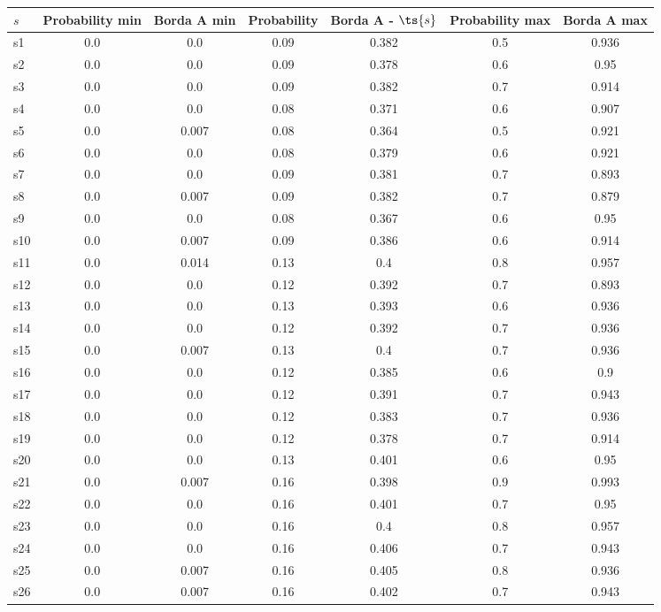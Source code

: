 \documentclass{article}
\begin{document}
\noindent\begin{tabular}{|l|c|c|c|c|c|c|}
\hline
$s$& Probability min & Borda A min & Probability & Borda A - $\ts{s}$ & Probability max & Borda A max\\
\hline
s1 &0.0 & 0.0 & 0.09 & 0.382 & 0.5 & 0.936\\
\hline
s2 &0.0 & 0.0 & 0.09 & 0.378 & 0.6 & 0.95\\
\hline
s3 &0.0 & 0.0 & 0.09 & 0.382 & 0.7 & 0.914\\
\hline
s4 &0.0 & 0.0 & 0.08 & 0.371 & 0.6 & 0.907\\
\hline
s5 &0.0 & 0.007 & 0.08 & 0.364 & 0.5 & 0.921\\
\hline
s6 &0.0 & 0.0 & 0.08 & 0.379 & 0.6 & 0.921\\
\hline
s7 &0.0 & 0.0 & 0.09 & 0.381 & 0.7 & 0.893\\
\hline
s8 &0.0 & 0.007 & 0.09 & 0.382 & 0.7 & 0.879\\
\hline
s9 &0.0 & 0.0 & 0.08 & 0.367 & 0.6 & 0.95\\
\hline
s10 &0.0 & 0.007 & 0.09 & 0.386 & 0.6 & 0.914\\
\hline
s11 &0.0 & 0.014 & 0.13 & 0.4 & 0.8 & 0.957\\
\hline
s12 &0.0 & 0.0 & 0.12 & 0.392 & 0.7 & 0.893\\
\hline
s13 &0.0 & 0.0 & 0.13 & 0.393 & 0.6 & 0.936\\
\hline
s14 &0.0 & 0.0 & 0.12 & 0.392 & 0.7 & 0.936\\
\hline
s15 &0.0 & 0.007 & 0.13 & 0.4 & 0.7 & 0.936\\
\hline
s16 &0.0 & 0.0 & 0.12 & 0.385 & 0.6 & 0.9\\
\hline
s17 &0.0 & 0.0 & 0.12 & 0.391 & 0.7 & 0.943\\
\hline
s18 &0.0 & 0.0 & 0.12 & 0.383 & 0.7 & 0.936\\
\hline
s19 &0.0 & 0.0 & 0.12 & 0.378 & 0.7 & 0.914\\
\hline
s20 &0.0 & 0.0 & 0.13 & 0.401 & 0.6 & 0.95\\
\hline
s21 &0.0 & 0.007 & 0.16 & 0.398 & 0.9 & 0.993\\
\hline
s22 &0.0 & 0.0 & 0.16 & 0.401 & 0.7 & 0.95\\
\hline
s23 &0.0 & 0.0 & 0.16 & 0.4 & 0.8 & 0.957\\
\hline
s24 &0.0 & 0.0 & 0.16 & 0.406 & 0.7 & 0.943\\
\hline
s25 &0.0 & 0.007 & 0.16 & 0.405 & 0.8 & 0.936\\
\hline
s26 &0.0 & 0.007 & 0.16 & 0.402 & 0.7 & 0.943\\

\end{tabular}
\end{document}
